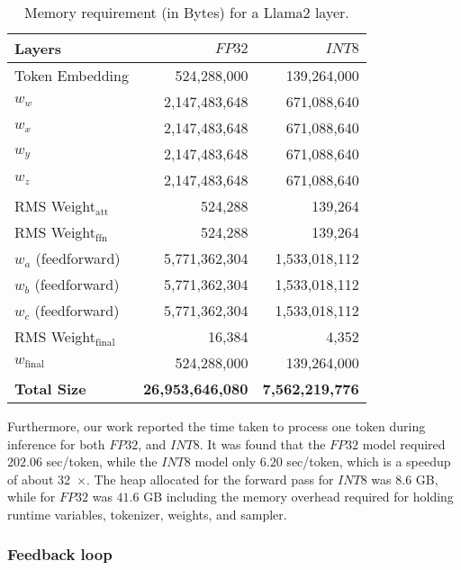 \begin{table}[t]
\centering
\caption{Memory requirement (in Bytes) for a Llama2 layer.}
\label{tab:memory_requirement}
\begin{tabular}{|l|r|r|}
\hline
\textbf{Layers} & \textbf{$FP32$} & \textbf{$INT8$} \\ \hline
Token Embedding & 524,288,000 & 139,264,000 \\ \hline
$w_w$ & 2,147,483,648 & 671,088,640 \\ \hline
$w_x$ & 2,147,483,648 & 671,088,640 \\ \hline
$w_y$ & 2,147,483,648 & 671,088,640 \\ \hline
$w_z$ & 2,147,483,648 & 671,088,640 \\ \hline
RMS Weight$_{\text{att}}$ & 524,288 & 139,264 \\ \hline
RMS Weight$_{\text{ffn}}$ & 524,288 & 139,264 \\ \hline
$w_a$ (feedforward) & 5,771,362,304 & 1,533,018,112 \\ \hline
$w_b$ (feedforward) & 5,771,362,304 & 1,533,018,112 \\ \hline
$w_c$ (feedforward) & 5,771,362,304 & 1,533,018,112 \\ \hline
RMS Weight$_{\text{final}}$ & 16,384 & 4,352 \\ \hline
$w_{\text{final}}$ & 524,288,000 & 139,264,000 \\ \hline
\textbf{Total Size} & \textbf{26,953,646,080} & \textbf{7,562,219,776} \\ \hline
\end{tabular}
\end{table}


Furthermore, our work reported the time taken to process one token during inference for both $FP32$, and $INT8$. It was found that the $FP32$ model required $202.06$ sec/token, while the $INT8$ model only $6.20$ sec/token, which is a speedup of about 32~$\times$. 
The heap allocated for the forward pass for $INT8$ was $8.6$ GB, while for $FP32$ was $41.6$ GB including the memory overhead required for holding runtime variables, tokenizer, weights, and sampler.



\subsubsection{Feedback loop}
\label{subsub:feedback}

